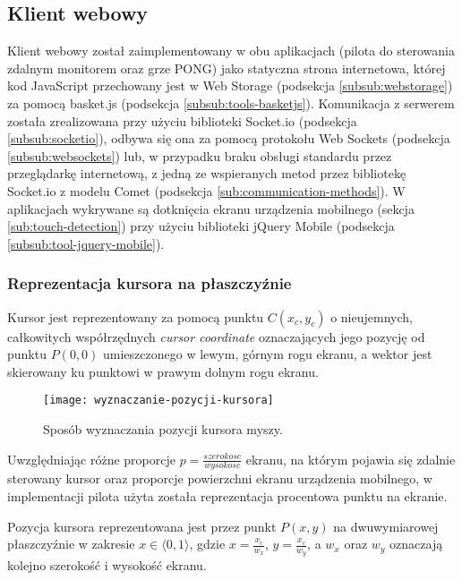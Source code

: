 \subsection{Klient webowy}
\label{subsub:impl-webclient}

Klient webowy został zaimplementowany w obu aplikacjach (pilota do sterowania zdalnym monitorem oraz grze PONG) jako statyczna strona internetowa, której kod JavaScript przechowany jest w Web Storage (podsekcja \ref{subsub:webstorage}) za pomocą basket.js (podsekcja \ref{subsub:tools-basketjs}). Komunikacja z serwerem została zrealizowana przy użyciu biblioteki Socket.io (podsekcja \ref{subsub:socketio}), odbywa się ona za pomocą protokołu Web Sockets (podsekcja \ref{subsub:websockets}) lub, w przypadku braku obsługi standardu przez przeglądarkę internetową, z jedną ze wspieranych metod przez bibliotekę Socket.io z modelu Comet (podsekcja \ref{sub:communication-methods}). W aplikacjach wykrywane są dotknięcia ekranu urządzenia mobilnego (sekcja \ref{sub:touch-detection}) przy użyciu biblioteki jQuery Mobile (podsekcja \ref{subsub:tool-jquery-mobile}).

\subsubsection{Reprezentacja kursora na płaszczyźnie}
\label{subsub:cursor-representation}

Kursor jest reprezentowany za pomocą punktu \(C(x_{c}, y_{c})\) o nieujemnych, całkowitych współrzędnych \emph{cursor coordinate} oznaczających jego pozycję od punktu \(P(0, 0)\) umieszczonego w lewym, górnym rogu ekranu, a wektor jest skierowany ku punktowi w prawym dolnym rogu ekranu.

\begin{figure}[h!]
  \centering
    \texttt{[image: wyznaczanie-pozycji-kursora]}
  \caption{Sposób wyznaczania pozycji kursora myszy.}
\end{figure}

Uwzględniając różne proporcje \(p = \frac{szerokosc}{wysokosc}\) ekranu, na którym pojawia się zdalnie sterowany kursor oraz proporcje powierzchni ekranu urządzenia mobilnego, w implementacji pilota użyta została reprezentacja procentowa punktu na ekranie.

Pozycja kursora reprezentowana jest przez punkt \(P(x, y)\) na dwuwymiarowej płaszczyźnie w zakresie \( x\in \langle0, 1\rangle \), gdzie \(x = \frac{x_{c}}{w_{x}}\), \(y = \frac{x_{c}}{w_{y}}\), a \(w_{x}\) oraz \(w_{y}\) oznaczają kolejno szerokość i wysokość ekranu.

